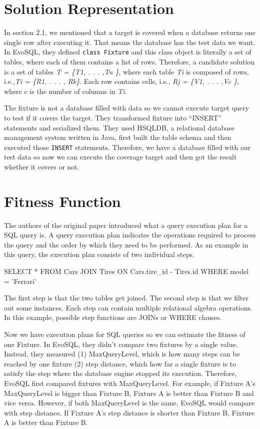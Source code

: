 \section{Solution Representation}
In section 2.1, we mentioned that a target is covered when a database returns one single row after executing it. That means the database has the test data we want. In EvoSQL, they defined \verb|class Fixture| and this class object is literally a set of tables, where each of them contains a list of rows. Therefore, a candidate solution is a set of tables \textit{T = \{T1, . . . ,Tn \}}, where each table \textit{Ti} is composed of rows, i.e.,\textit{Ti = \{R1, . . . , Rk\}}. Each row contains cells, i.e., \textit{Rj = \{V1, . . . ,Vc \}}, where c is the number of columns in \textit{Ti}. 

The fixture is not a database filled with data so we cannot execute target query to test if it covers the target. They transformed fixture into “INSERT” statements and serialized them. They used HSQLDB, a relational database management system written in Java, first built the table schema and then executed those \verb|INSERT| statements. Therefore, we have a database filled with our test data so now we can execute the coverage target and then got the result whether it covers or not.

\section{Fitness Function}
The authors of the original paper introduced what a query execution plan for a SQL query is. A query execution plan indicates the operations required to process the query and the order by which they need to be performed. As an example in this query, the execution plan consists of two individual steps.
\begin{CVerbatim}[fontsize=\small]
SELECT * 
FROM Cars
JOIN Tires
ON Cars.tire_id - Tires.id
WHERE model = 'Ferrari'
\end{CVerbatim}

The first step is that the two tables get joined. The second step is that we filter out some instances. Each step can contain multiple relational algebra operations. In this example, possible step functions are JOINs or WHERE clauses.

Now we have execution plans for SQL queries so we can estimate the fitness of one Fixture. In EvoSQL, they didn't compare two fixtures by a single value. Instead, they measured (1) MaxQueryLevel, which is how many steps can be reached by one fixture (2) step distance, which how far a single fixture is to satisfy the step where the database engine stopped its execution. Therefore, EvoSQL first compared fixtures with MaxQueryLevel. For example, if Fixture A's MaxQueryLevel is bigger than Fixture B, Fixture A is better than Fixture B and vice versa. However, if both MaxQueryLevel is the same, EvoSQL would compare with step distance. If Fixture A's step distance is shorter than Fixture B, Fixture A is better than Fixture B. 
